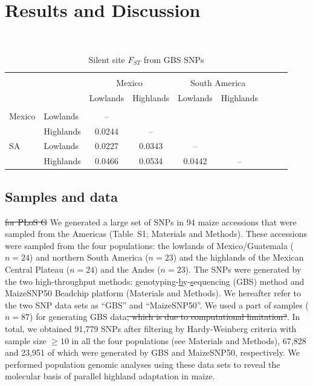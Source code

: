 \section*{Results and Discussion}

\renewcommand{\arraystretch}{1.1}
\begin{table}[tb]

\begin{center}
 \caption[]{Silent site $F_{ST}$ from GBS SNPs \hspace*{2.3cm}}
  \textbf{}\\[-2mm]
{\fontsize{7}{9}\sf
    \begin{tabular}{llccccccl}
    \hline
    & & \\[-3mm]
	&		&	\multicolumn{2}{c}{Mexico}		&	\multicolumn{2}{c}{South America}		\\
	&		&	Lowlands	&	Highlands	&	Lowlands	&	Highlands	\\
      \hline
    & & \\[-3mm]
Mexico	&	Lowlands	&	--	&		&		&		\\
	&	Highlands	&	0.0244	&	--	&		&		\\
SA	&	Lowlands	&	0.0227	&	0.0343	&	--	&		\\
	&	Highlands	&	0.0466	&	0.0534	&	0.0442	&	--	\\ [1mm]
    \hline
    \end{tabular}
    \label{FstP}  %
}
\end{center}
\end{table}
\renewcommand{\arraystretch}{1}

\subsection*{Samples and data}
\st{for PLoS G}
We generated a large set of SNPs in 94 maize accessions that were sampled from the Americas (Table~S1; Materials and Methods).
These accessions were sampled from the four populations: the lowlands of Mexico/Guatemala ($n=24$) and northern South America ($n=23$) and the highlands of the Mexican Central Plateau ($n=24$) and the Andes ($n=23$).
The SNPs were generated by the two high-throughput methods: \underline{g}enotyping-\underline{b}y-\underline{s}equencing (GBS) method and MaizeSNP50 Beadchip platform (Materials and Methods).  
We hereafter refer to the two SNP data sets as ``GBS'' and ``MaizeSNP50''.
We used a part of samples ($n=87$) for generating GBS data\st{, which is due to computational limitation?}.
In total, we obtained 91,779 SNPs after filtering by Hardy-Weinberg criteria with sample size $\geq10$ in all the four populations (see Materials and Methods), 67,828 and 23,951 of which were generated by GBS and MaizeSNP50, respectively.  
We performed population genomic analyses using these data sets to reveal the molecular basis of parallel highland adaptation in maize.


